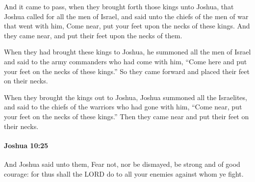 			\begin{versebox}
					\item[BHS] 
					\item[ASV] And it came to pass, when they brought forth those kings unto Joshua, that Joshua called for all the men of Israel, and said unto the chiefs of the men of war that went with him, Come near, put your feet upon the necks of these kings. And they came near, and put their feet upon the necks of them.
					\item[NIV] When they had brought these kings to Joshua, he summoned all the men of Israel and said to the army commanders who had come with him, “Come here and put your feet on the necks of these kings.” So they came forward and placed their feet on their necks.
					\item[NRSV] When they brought the kings out to Joshua, Joshua summoned all the Israelites, and said to the chiefs of the warriors who had gone with him, “Come near, put your feet on the necks of these kings.” Then they came near and put their feet on their necks.
			\end{versebox}

		\paragraph{Joshua 10:25} %
			\label{JOSHUA-10-25}

			And Joshua said unto them, Fear not, nor be dismayed, be strong and of good courage: for thus shall the LORD do to all your enemies against whom ye fight.

